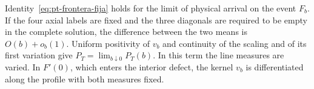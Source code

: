 Identity~\eqref{eq:pt-frontera-fija} holds for the limit of physical arrival on the event \(F_b\).
If the four
axial labels are fixed and the three diagonals are required to be empty in the complete solution, the
difference between the two means is \(O(b)+o_b(1)\). Uniform positivity of \(v_b\) and continuity of the
scaling and of its first variation give \(P_T=\lim_{b\downarrow0}P_T(b)\). In this term the line measures
are varied. In \(F'(0)\), which enters the interior defect, the kernel \(v_b\) is differentiated along
the profile with both measures fixed.
